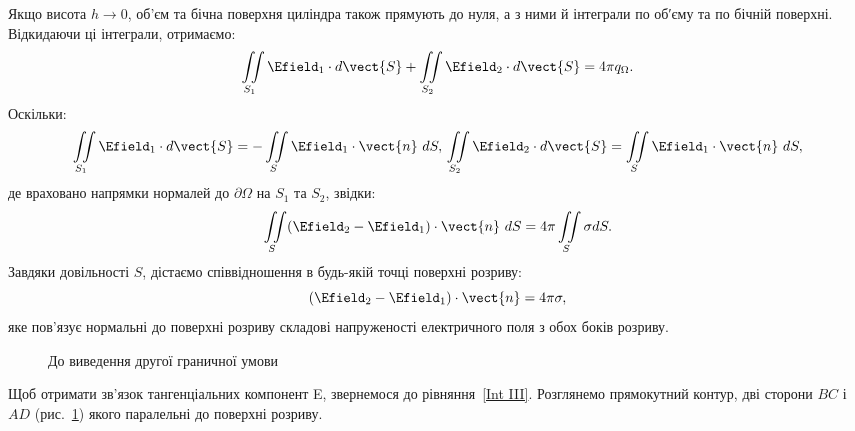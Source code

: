 Якщо висота $h  \to 0$, об'єм та бічна поверхня циліндра також прямують до нуля, а з ними й інтеграли по об′єму та по бічній поверхні. Відкидаючи ці
інтеграли, отримаємо:
\begin{equation*}
	\iint\limits_{S_1} \Efield_1\cdot d\vect{S} +  \iint\limits_{S_2} \Efield_2\cdot d\vect{S}  = 4\pi q_{\Omega}.
\end{equation*}
Оскільки:
\begin{equation*}
	\iint\limits_{S_1} \Efield_1\cdot d\vect{S}  = - \iint\limits_{S} \Efield_1\cdot \vect{n}\ dS, \quad \\
	\iint\limits_{S_2} \Efield_2\cdot d\vect{S} = \iint\limits_{S} \Efield_1\cdot \vect{n}\ dS,
\end{equation*}
де враховано напрямки нормалей до $\partial\Omega$ на $S_1$ та $S_2$, звідки:
\begin{equation*}
	\iint\limits_{S} (\Efield_2 - \Efield_1)\cdot\vect{n}\ dS = 4\pi \iint\limits_S \sigma dS.
\end{equation*}
Завдяки довільності $S$, дістаємо співвідношення в будь-якій точці поверхні
розриву:
\begin{equation}\label{eq:bc1}
	(\Efield_2 - \Efield_1)\cdot\vect{n} = 4\pi\sigma,
\end{equation}
яке пов’язує нормальні до поверхні розриву складові напруженості
електричного поля з обох боків розриву.

\begin{figure}
	\centering
	\caption{До виведення другої граничної умови}%
	\label{tikz:bc2}
\end{figure}

Щоб отримати зв’язок тангенціальних компонент E, звернемося до рівняння~\eqref{Int III}. Розглянемо прямокутний контур, дві сторони $BC$ і $AD$
(рис.~\ref{tikz:bc2}) якого паралельні до поверхні розриву.


